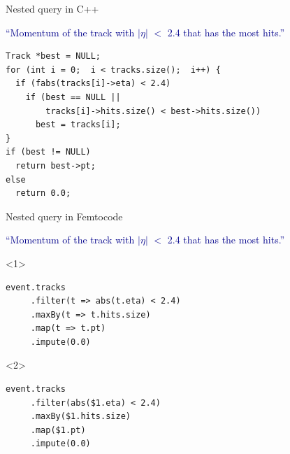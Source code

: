 \documentclass{beamer}
\begin{document}
\begin{frame}[fragile]{Nested query in C++}
\vspace{0.25 cm}
\begin{center}
\begin{minipage}{0.95\linewidth}
\textcolor{darkblue}{``Momentum of the track with $|\eta|$ $<$ 2.4 that has the most hits.''}
\end{minipage}
\end{center}
\small
\begin{verbatim}
Track *best = NULL;
for (int i = 0;  i < tracks.size();  i++) {
  if (fabs(tracks[i]->eta) < 2.4)
    if (best == NULL ||
        tracks[i]->hits.size() < best->hits.size())
      best = tracks[i];
}
if (best != NULL)
  return best->pt;
else
  return 0.0;
\end{verbatim}
\end{frame}

\begin{frame}[fragile]{Nested query in Femtocode}
\vspace{0.25 cm}
\begin{center}
\begin{minipage}{0.95\linewidth}
\textcolor{darkblue}{``Momentum of the track with $|\eta|$ $<$ 2.4 that has the most hits.''}
\end{minipage}
\end{center}
\small
\begin{onlyenv}<1>
\begin{verbatim}
event.tracks
     .filter(t => abs(t.eta) < 2.4)
     .maxBy(t => t.hits.size)
     .map(t => t.pt)
     .impute(0.0)
\end{verbatim}
\end{onlyenv}
\begin{onlyenv}<2>
\begin{verbatim}
event.tracks
     .filter(abs($1.eta) < 2.4)
     .maxBy($1.hits.size)
     .map($1.pt)
     .impute(0.0)
\end{verbatim}
\end{onlyenv}
\end{frame}
\end{document}
